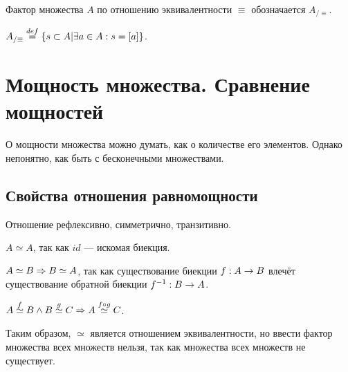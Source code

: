 \documentclass[a4paper]{report}
\begin{document}
    Фактор множества $A$ по отношению эквивалентности $\equiv$ обозначается $A_{/\equiv}$.

    $A_{/\equiv}\overset{def}{=}\{s \subset A | \exists a \in A : s = [a]\}$.



    \section{Мощность множества. Сравнение мощностей}

    О мощности множества можно думать, как о количестве его элементов.
    Однако непонятно, как быть с бесконечными множествами.

    \subsection{Свойства отношения равномощности}

    Отношение рефлексивно, симметрично, транзитивно.

    $A \simeq A$, так как $id$ --- искомая биекция.

    $A \simeq B \Rightarrow B \simeq A$, так как существование биекции $f : A \rightarrow B$ влечёт существование обратной биекции $f^{-1} : B \rightarrow A$.

    $A \overset{f}{\simeq} B \land B \overset{g}{\simeq} C \Rightarrow A \overset{f \circ g}{\simeq} C$.

    Таким образом, $\simeq$ является отношением эквивалентности, но ввести фактор множества всех множеств нельзя, так как множества всех множеств не существует.

\end{document}
